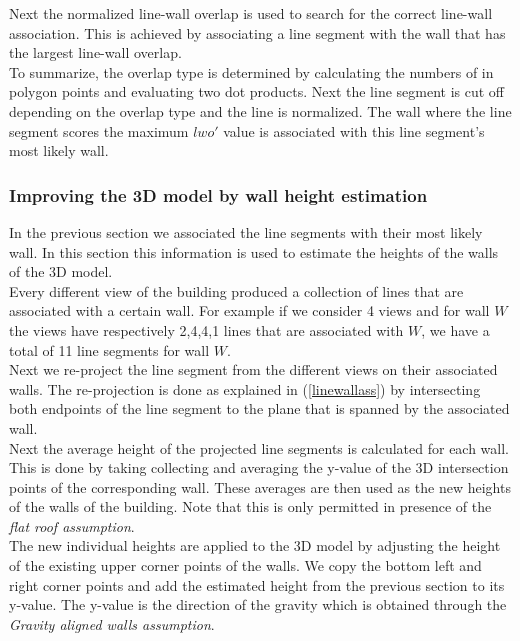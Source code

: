 	Next the normalized line-wall overlap is used to search for the correct
	line-wall association. This is achieved by associating a line segment with
	the wall that has the largest line-wall overlap.\\

	To summarize, the overlap type is determined by calculating the numbers of in
	polygon points and evaluating two dot products. Next the line segment is cut off
	depending on the overlap type and the line is normalized. 
	The wall where the line segment scores the maximum $lwo'$ value is
	associated with this line segment's most likely wall.  \\


\subsubsection{Improving the 3D model by wall height estimation}
	In the previous section we associated the line segments with their most
	likely wall. In this section this information is used to estimate the
	heights of the walls of the 3D model. \\

	Every different view of the building produced a collection of lines that are
	associated with a certain wall. For example if we consider 4 views and for
	wall $W$ the views have respectively 2,4,4,1 lines that are associated with
	$W$, we have a total of 11 line segments for wall $W$.\\

	Next we re-project the line segment from the different views on their
	associated walls.  The re-projection is done as explained in
	(\ref{linewallass}) by intersecting both endpoints
	of the line segment to the plane that is spanned by the associated wall.\\

	Next the average height of the projected line segments is calculated for
	each wall. This is done by taking collecting and averaging the y-value of
	the 3D intersection points of the corresponding wall.  These averages are
	then used as the new heights of the walls of the building.  Note that this
	is only permitted in presence of the \emph{flat roof assumption}.\\

	The new individual heights are applied to the 3D model by adjusting the
	height of the existing upper corner points of the walls. We copy the bottom
	left and right corner points and add the estimated height from the previous
	section to its y-value. The y-value is the direction of the gravity which is
	obtained through the \emph{Gravity aligned walls assumption}.

